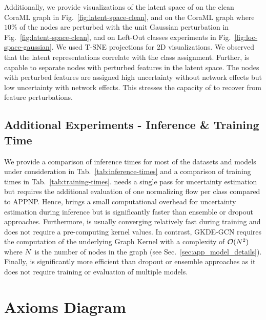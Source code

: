 Additionally, we provide visualizations of the latent space of \GPNacro{} on the clean CoraML graph in Fig.~\ref{fig:latent-space-clean}, and on the CoraML graph where $10\%$ of the nodes are perturbed with  the unit Gaussian perturbation in Fig.~\ref{fig:latent-space-clean}, and on Left-Out classes experiments in Fig.~\ref{fig:loc-space-gaussian}. We used T-SNE projections for 2D visualizations. We observed that the latent representations correlate with the class assignment. Further, \GPNacro{} is capable to separate nodes with perturbed features in the latent space. The nodes with perturbed features are assigned high uncertainty without network effects but low uncertainty with network effects. This stresses the capacity of \GPNacro{} to recover from feature perturbations. 
%

%

%


\subsection{Additional Experiments - Inference \& Training Time}
\label{sec:add-exp-time}

We provide a comparison of inference times for most of the datasets and models under consideration in Tab.~\ref{tab:inference-times} and a comparison of training times in Tab.~\ref{tab:training-times}. \GPNacro{} needs a single pass for uncertainty estimation but requires the additional evaluation of one normalizing flow per class compared to APPNP. Hence, \GPNacro{} brings a small computational overhead for uncertainty estimation during inference but is significantly faster than ensemble or dropout approaches. Furthermore, \GPNacro{} is usually converging relatively fast during training and does not require a pre-computing kernel values. In contrast, GKDE-GCN requires the computation of the underlying Graph Kernel with a complexity of $\mathcal{O}(N^2)$ where $N$ is the number of nodes in the graph (see Sec.~\ref{sec:app_model_details}). Finally, \GPNacro{} is significantly more efficient than dropout or ensemble approaches as it does not require training or evaluation of multiple models.




\section{Axioms Diagram}


